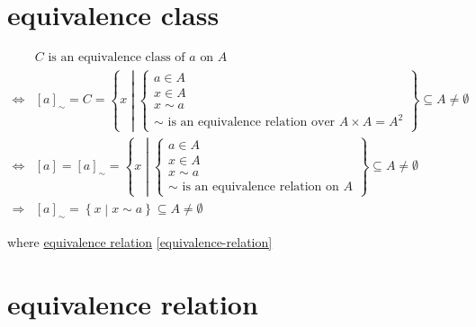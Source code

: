 \documentclass[
]{book}
\theoremstyle{definition}
\theoremstyle{definition}
\theoremstyle{definition}
\theoremstyle{definition}
\theoremstyle{remark}
\begin{document}
\hypertarget{equivalence-class-1}{%
\chapter*{equivalence class}\label{equivalence-class-1}}

\begin{align*}
 & C\text{ is an equivalence class of }a\text{ on }A\\
\Leftrightarrow & \left[a\right]_{\sim}=C=\left\{ x\middle|\begin{cases}
a\in A\\
x\in A\\
x\sim a\\
\sim\text{ is an equivalence relation over }A\times A=A^{2}
\end{cases}\right\} \subseteq A\ne\emptyset\\
\Leftrightarrow & \left[a\right]=\left[a\right]_{\sim}=\left\{ x\middle|\begin{cases}
a\in A\\
x\in A\\
x\sim a\\
\sim\text{ is an equivalence relation on }A
\end{cases}\right\} \subseteq A\ne\emptyset\\
\Rightarrow & \left[a\right]_{\sim}=\left\{ x\middle|x\sim a\right\} \subseteq A\ne\emptyset
\end{align*}

where \protect\hyperlink{equivalence-relation}{equivalence relation} \ref{equivalence-relation}

\hypertarget{equivalence-relation-1}{%
\chapter*{equivalence relation}\label{equivalence-relation-1}}
\end{document}
